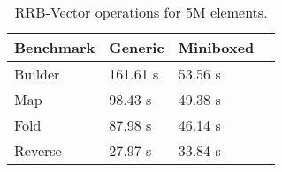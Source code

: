 \begin{table}[t]
  \centering
  \begin{tabularx}{0.48\textwidth}{|g *{3}{|Y}|} \hline
    \textbf{Benchmark} & \textbf{Generic}      & \textbf{Miniboxed} \\  \hline
    Builder            &        161.61 s       &           53.56 s  \\
    Map                &         98.43 s       &           49.38 s  \\
    Fold               &         87.98 s       &           46.14 s  \\
    Reverse            &         27.97 s       &           33.84 s  \\  \hline
  \end{tabularx}
  \vspace{-2mm}
  \caption{RRB-Vector operations for 5M elements.}
  \label{table:pureimage}
  \vspace{-1em}
\end{table}
